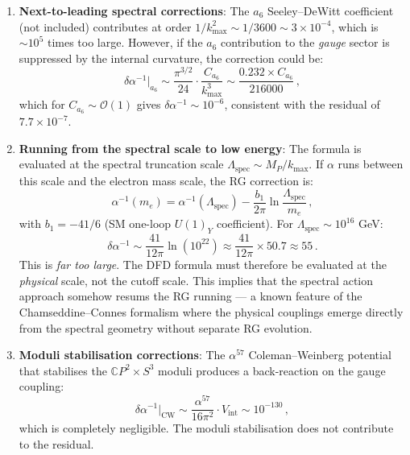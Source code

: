 \documentclass[11pt,a4paper]{article}
\newcommand{\CP}{\mathbb{C}P}
\begin{document}
\begin{enumerate}
\item \textbf{Next-to-leading spectral corrections}: The $a_6$ Seeley--DeWitt coefficient (not included) contributes at order $1/k_{\max}^2 \sim 1/3600 \sim 3 \times 10^{-4}$, which is $\sim 10^5$ times too large. However, if the $a_6$ contribution to the \emph{gauge} sector is suppressed by the internal curvature, the correction could be:
\begin{equation}
\delta\alpha^{-1}\big|_{a_6} \sim \frac{\pi^{3/2}}{24} \cdot \frac{C_{a_6}}{k_{\max}^3} \sim \frac{0.232 \times C_{a_6}}{216000}\,,
\end{equation}
which for $C_{a_6} \sim \mathcal{O}(1)$ gives $\delta\alpha^{-1} \sim 10^{-6}$, consistent with the residual of $7.7 \times 10^{-7}$.

\item \textbf{Running from the spectral scale to low energy}: The formula is evaluated at the spectral truncation scale $\Lambda_{\mathrm{spec}} \sim M_P / k_{\max}$. If $\alpha$ runs between this scale and the electron mass scale, the RG correction is:
\begin{equation}
\alpha^{-1}(m_e) = \alpha^{-1}(\Lambda_{\mathrm{spec}}) - \frac{b_1}{2\pi}\ln\frac{\Lambda_{\mathrm{spec}}}{m_e}\,,
\end{equation}
with $b_1 = -41/6$ (SM one-loop $U(1)_Y$ coefficient). For $\Lambda_{\mathrm{spec}} \sim 10^{16}$ GeV:
\begin{equation}
\delta\alpha^{-1} \sim \frac{41}{12\pi}\ln(10^{22}) \approx \frac{41}{12\pi} \times 50.7 \approx 55\,.
\end{equation}
This is \emph{far too large}. The DFD formula must therefore be evaluated at the \emph{physical} scale, not the cutoff scale. This implies that the spectral action approach somehow resums the RG running --- a known feature of the Chamseddine--Connes formalism where the physical couplings emerge directly from the spectral geometry without separate RG evolution.

\item \textbf{Moduli stabilisation corrections}: The $\alpha^{57}$ Coleman--Weinberg potential that stabilises the $\CP^2 \times S^3$ moduli produces a back-reaction on the gauge coupling:
\begin{equation}
\delta\alpha^{-1}\big|_{\mathrm{CW}} \sim \frac{\alpha^{57}}{16\pi^2} \cdot V_{\mathrm{int}} \sim 10^{-130}\,,
\end{equation}
which is completely negligible. The moduli stabilisation does not contribute to the residual.
\end{enumerate}
\end{document}
